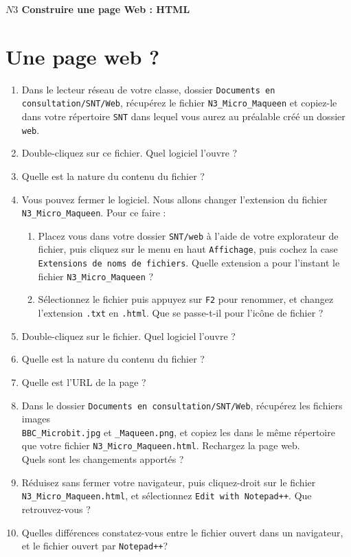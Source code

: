 \documentclass[a4paper,12pt]{article}
\begin{document}
\sffamily %
\begin{center}
 \large{\textbf{$N3$ Construire une page Web : HTML}}
\end{center}


\section{Une page web ?}
\begin{enumerate}
\item Dans le lecteur réseau de votre classe, dossier \texttt{Documents en consultation/SNT/Web}, récupérez le fichier \texttt{N3\_Micro\_Maqueen} et copiez-le dans votre répertoire \texttt{SNT} dans lequel vous aurez au préalable créé un dossier \texttt{web}.
\item Double-cliquez sur ce fichier. Quel logiciel l'ouvre ? 
\item Quelle est la nature du contenu du fichier ? 
\item Vous pouvez fermer le logiciel. Nous allons changer l'extension du fichier \texttt{N3\_Micro\_Maqueen}. Pour ce faire :
\begin{enumerate}
\item Placez vous dans votre dossier \texttt{SNT/web} à l'aide de votre explorateur de fichier,  puis cliquez sur le menu en haut \texttt{Affichage}, puis cochez la case \texttt{Extensions de noms de fichiers}. Quelle extension a pour l'instant le fichier \texttt{N3\_Micro\_Maqueen} ?
\item Sélectionnez le fichier puis appuyez sur \texttt{F2} pour renommer, et changez l'extension \texttt{.txt} en \texttt{.html}. Que se passe-t-il pour l'icône de fichier ? 
 \end{enumerate}
\item Double-cliquez sur le fichier. Quel logiciel l'ouvre ? 
\item Quelle est la nature du contenu du fichier ? 
\item Quelle est l'URL de la page ? 
\item Dans le dossier \texttt{Documents en consultation/SNT/Web}, récupérez les fichiers images\\ \texttt{BBC\_Microbit.jpg} et \texttt{\_Maqueen.png}, et copiez les dans le même répertoire que votre fichier \texttt{N3\_Micro\_Maqueen.html}. Rechargez la page web.\\ Quels sont les changements apportés ? 
\item Réduisez sans fermer votre navigateur, puis cliquez-droit sur le fichier \texttt{N3\_Micro\_Maqueen.html}, et sélectionnez \texttt{Edit with Notepad++}. Que retrouvez-vous ? 
\item Quelles différences constatez-vous entre le fichier ouvert dans un navigateur, et le fichier ouvert par \texttt{Notepad++}?
\end{enumerate}
\pagebreak
\end{document}
